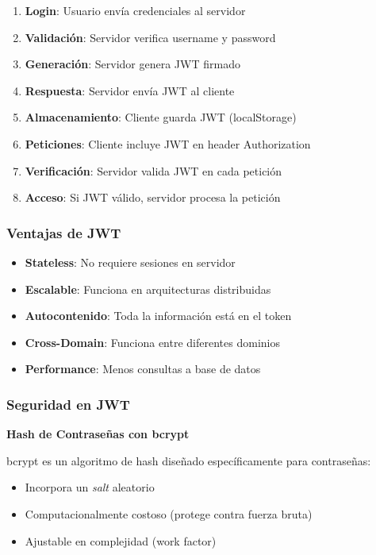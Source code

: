 \documentclass[12pt,a4paper]{article}
\begin{document}
\begin{enumerate}[leftmargin=*]
    \item \textbf{Login}: Usuario envía credenciales al servidor
    \item \textbf{Validación}: Servidor verifica username y password
    \item \textbf{Generación}: Servidor genera JWT firmado
    \item \textbf{Respuesta}: Servidor envía JWT al cliente
    \item \textbf{Almacenamiento}: Cliente guarda JWT (localStorage)
    \item \textbf{Peticiones}: Cliente incluye JWT en header Authorization
    \item \textbf{Verificación}: Servidor valida JWT en cada petición
    \item \textbf{Acceso}: Si JWT válido, servidor procesa la petición
\end{enumerate}

\subsubsection{Ventajas de JWT}

\begin{itemize}[leftmargin=*]
    \item \textbf{Stateless}: No requiere sesiones en servidor
    \item \textbf{Escalable}: Funciona en arquitecturas distribuidas
    \item \textbf{Autocontenido}: Toda la información está en el token
    \item \textbf{Cross-Domain}: Funciona entre diferentes dominios
    \item \textbf{Performance}: Menos consultas a base de datos
\end{itemize}

\subsubsection{Seguridad en JWT}

\textbf{Hash de Contraseñas con bcrypt}

bcrypt es un algoritmo de hash diseñado específicamente para contraseñas:
\begin{itemize}
    \item Incorpora un \textit{salt} aleatorio
    \item Computacionalmente costoso (protege contra fuerza bruta)
    \item Ajustable en complejidad (work factor)
\end{itemize}
\end{document}
